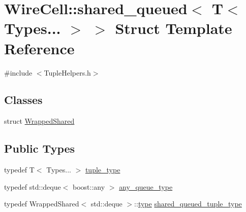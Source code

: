 \hypertarget{struct_wire_cell_1_1shared__queued_3_01_t_3_01_types_8_8_8_01_4_01_4}{}\section{Wire\+Cell\+:\+:shared\+\_\+queued$<$ T$<$ Types... $>$ $>$ Struct Template Reference}
\label{struct_wire_cell_1_1shared__queued_3_01_t_3_01_types_8_8_8_01_4_01_4}


{\ttfamily \#include $<$Tuple\+Helpers.\+h$>$}

\subsection*{Classes}
\begin{DoxyCompactItemize}
\item 
struct \hyperlink{struct_wire_cell_1_1shared__queued_3_01_t_3_01_types_8_8_8_01_4_01_4_1_1_wrapped_shared}{Wrapped\+Shared}
\end{DoxyCompactItemize}
\subsection*{Public Types}
\begin{DoxyCompactItemize}
\item 
typedef T$<$ Types... $>$ \hyperlink{struct_wire_cell_1_1shared__queued_3_01_t_3_01_types_8_8_8_01_4_01_4_a707744c73233f8c1ab8943ebd2c3e7e1}{tuple\+\_\+type}
\item 
typedef std\+::deque$<$ boost\+::any $>$ \hyperlink{struct_wire_cell_1_1shared__queued_3_01_t_3_01_types_8_8_8_01_4_01_4_a8ff8e1f0ff23fd750a91eeb2d4952bb0}{any\+\_\+queue\+\_\+type}
\item 
typedef Wrapped\+Shared$<$ std\+::deque $>$\+::\hyperlink{namespace_wire_cell_a1f69a2598e2cdb413ffac1157b50670a}{type} \hyperlink{struct_wire_cell_1_1shared__queued_3_01_t_3_01_types_8_8_8_01_4_01_4_ab8420ec9cbc02f0d73f0e7521a063cb0}{shared\+\_\+queued\+\_\+tuple\+\_\+type}
\end{DoxyCompactItemize}
